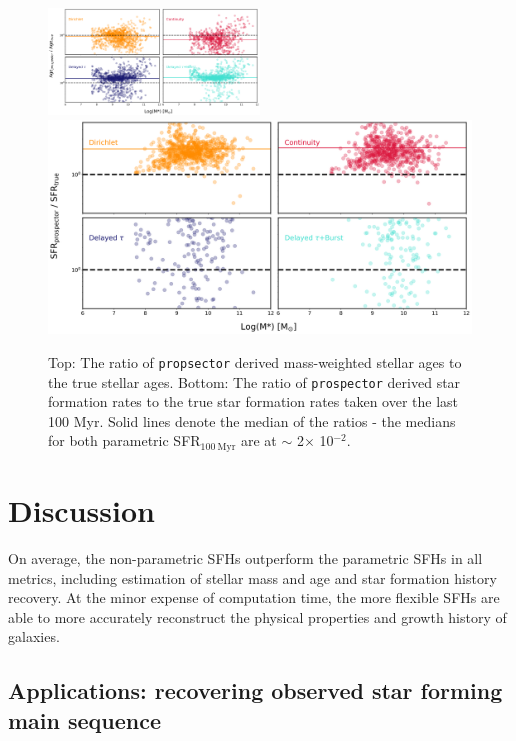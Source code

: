 \documentclass[twocolumn]{aastex62}
\begin{document}
\begin{figure}[h]

\centering
\includegraphics[width=0.5\textwidth]{ages_comp.png}\hfill
\includegraphics[width=.5\textwidth]{sfr_comp_grid_M.png}

\caption{Top: The ratio of \texttt{propsector} derived mass-weighted stellar ages to the true stellar ages. Bottom: The ratio of \texttt{prospector} derived star formation rates to the true star formation rates taken over the last 100 Myr. Solid lines denote the median of the ratios - the medians for both parametric SFR$_{100 \: \mathrm{Myr}}$ are at $\sim$ 2$\times$ 10$^{-2}$.}
\label{fig:age_sfr}

\end{figure}




\section{Discussion}

On average, the non-parametric SFHs outperform the parametric SFHs in all metrics, including estimation of stellar mass and age and star formation history recovery. At the minor expense of computation time, the more flexible SFHs are able to more accurately reconstruct the physical properties and growth history of galaxies. 


\subsection{Applications: recovering observed star forming main sequence}
\end{document}

